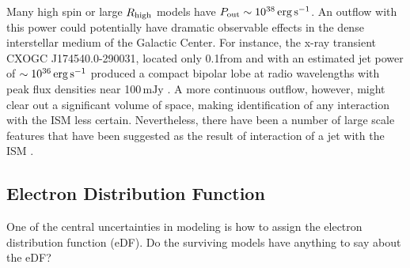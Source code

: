 Many high spin or large $R_\mathrm{high}$ models have $P_\mathrm{out} \sim 10^{38} \,\mathrm{erg\,s^{-1}}$.
An outflow with this power could potentially have dramatic observable effects in the dense interstellar medium of the Galactic Center.  For instance, the x-ray transient CXOGC J174540.0-290031, located only 0.1\pc from \sgra and with an estimated jet power of $\sim 10^{36}\,\mathrm{erg\,s^{-1}}$ produced a compact bipolar lobe at radio wavelengths with peak flux densities near 100$\,\mathrm{mJy}$ \citep{2005ApJ...633..218B}.  A more continuous  outflow, however, might clear out a significant volume of space, making identification of any interaction with the ISM less certain.  Nevertheless, there have been a number of large scale features that have been suggested as the result of interaction of a jet with the ISM \citep[e.g.][]{2013ApJ...779..154L,2021ApJ...922..254C}.


\subsection{Electron Distribution Function}

One of the central uncertainties in modeling \sgra is how to assign the electron distribution function (eDF).  Do the surviving models have anything to say about the eDF?

